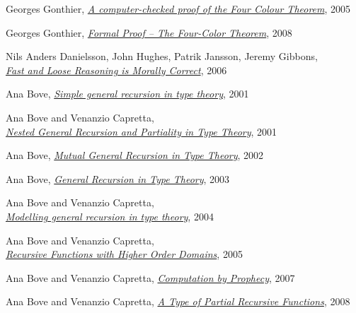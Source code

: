 \documentclass[declaration,mgr,english,shortabstract]{iithesis}
\begin{document}
\begin{thebibliography}{1}
    Georges Gonthier,
    \href{https://www.cl.cam.ac.uk/~lp15/Pages/4colproof.pdf}{\textit{A computer-checked proof of the Four Colour Theorem}},
    2005

    Georges Gonthier,
    \href{http://www.ams.org/notices/200811/tx081101382p.pdf}{\textit{Formal Proof -- The Four-Color Theorem}},
    2008

    Nils Anders Danielsson, John Hughes, Patrik Jansson, Jeremy Gibbons, \\
    \href{https://www.cs.ox.ac.uk/jeremy.gibbons/publications/fast+loose.pdf}{\textit{Fast and Loose Reasoning is Morally Correct}},
    2006

    Ana Bove,
    \href{https://dl.acm.org/doi/10.5555/774194.774197}{\textit{Simple general recursion in type theory}},
    2001

    Ana Bove and Venanzio Capretta, \\
    \href{https://www.researchgate.net/publication/285777618_Nested_General_Recursion_and_Partiality_in_Type_Theory}{\textit{Nested General Recursion and Partiality in Type Theory}},
    2001

    Ana Bove,
    \href{https://core.ac.uk/display/197949303}{\textit{Mutual General Recursion in Type Theory}},
    2002

    Ana Bove,
    \href{https://link.springer.com/chapter/10.1007/3-540-39185-1_3}{\textit{General Recursion in Type Theory}},
    2003

    Ana Bove and Venanzio Capretta, \\
    \href{http://www.cs.nott.ac.uk/~pszvc/publications/General_Recursion_MSCS_2005.pdf}{\textit{Modelling general recursion in type theory}},
    2004

    Ana Bove and Venanzio Capretta, \\
    \href{http://www.cs.ru.nl/~venanzio/publications/Higher_Domains_TLCA2005.pdf}{\textit{Recursive Functions with Higher Order Domains}},
    2005

    Ana Bove and Venanzio Capretta,
    \href{https://www.researchgate.net/publication/220727479_Computation_by_Prophecy}{\textit{Computation by Prophecy}},
    2007

    Ana Bove and Venanzio Capretta,
    \href{https://www.researchgate.net/publication/221302295_A_Type_of_Partial_Recursive_Functions}{\textit{A Type of Partial Recursive Functions}},
    2008


\end{thebibliography}
\end{document}
